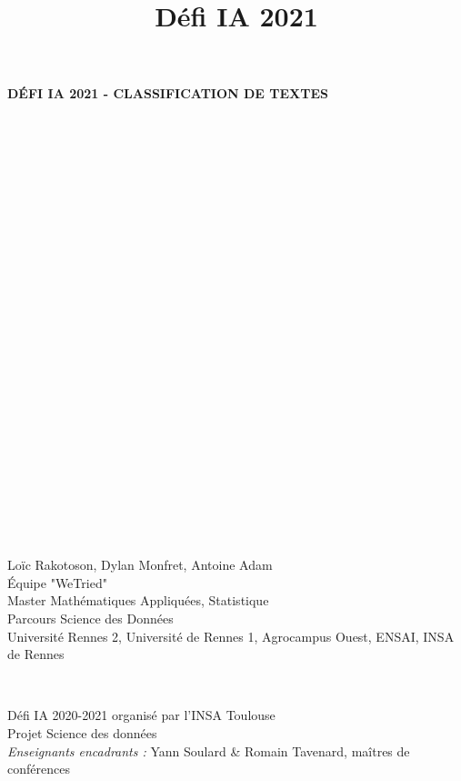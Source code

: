 

\title{Défi IA 2021}


	\begin{titlepage}
   \begin{center}
       \vspace*{1cm}

       \textbf{DÉFI IA 2021 - CLASSIFICATION DE TEXTES}
    \end{center}
\hfill\\\hfill\\\hfill\\\hfill\\\hfill\\\hfill\\\hfill\\\hfill\\\hfill\\\hfill\\\hfill\\\hfill\\\hfill\\\hfill\\\hfill\\\hfill\\\hfill\\\hfill\\\hfill\\
\hfill\\\hfill\\\hfill\\\hfill\\\hfill\\
	\begin{minipage}{0.55\textwidth}

		\begin{flushleft} \large
			Loïc Rakotoson, Dylan Monfret, Antoine Adam \\
			Équipe "WeTried" \\
			Master Mathématiques Appliquées, Statistique \\
			Parcours Science des Données\\
            		Université Rennes 2, Université de Rennes 1, Agrocampus Ouest, ENSAI, INSA de Rennes
			\end{flushleft}
			\end{minipage}~
			\begin{minipage}{0.5\textwidth}
            
			\begin{flushright} \large
			Défi IA 2020-2021 organisé par l'INSA Toulouse \\
			Projet Science des données\\
			\emph{Enseignants encadrants :}
            		Yann Soulard \& Romain Tavenard, maîtres de conférences
		\end{flushright}
        
	\end{minipage}\\[2 cm]
	\end{titlepage}

\tableofcontents






\printendnotes



